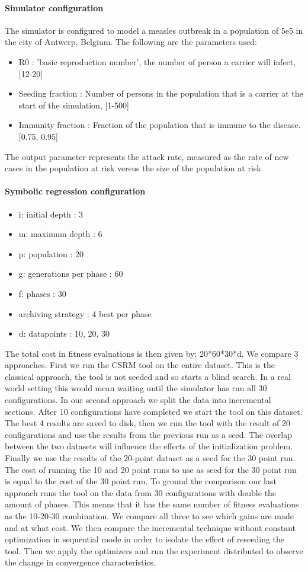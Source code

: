 \paragraph{Simulator configuration}
The simulator is configured to model a measles outbreak in a population of 5e5 in the city of Antwerp, Belgium. 
The following are the parameters used:
\begin{itemize}
\item R0 : 'basic reproduction number', the number of person a carrier will infect, [12-20]
\item Seeding fraction : Number of persons in the population that is a carrier at the start of the simulation, [1-500]
\item Immunity fraction : Fraction of the population that is immune to the disease. [0.75, 0.95]
\end{itemize}
The output parameter represents the attack rate, measured as the rate of new cases in the population at risk versus the size of the population at risk.
\paragraph{Symbolic regression configuration}
\begin{itemize}
\item i: initial depth : 3
\item m: maximum depth : 6
\item p: population : 20
\item g: generations per phase : 60
\item f: phases : 30
\item archiving strategy : 4 best per phase
\item d: datapoints : 10, 20, 30
\end{itemize}
The total cost in fitness evaluations is then given by: 20*60*30*d.
We compare 3 approaches. First we run the CSRM tool on the entire dataset. This is the classical approach, the tool is not seeded and so starts a blind search. In a real world setting this would mean waiting until the simulator has run all 30 configurations.
In our second approach we split the data into incremental sections. After 10 configurations have completed we start the tool on this dataset. 
The best 4 results are saved to disk, then we run the tool with the result of 20 configurations and use the results from the previous run as a seed. The overlap between the two datasets will influence the effects of the initialization problem. Finally we use the results of the 20-point dataset as a seed for the 30 point run. 
The cost of running the 10 and 20 point runs to use as seed for the 30 point run is equal to the cost of the 30 point run. 
To ground the comparison our last approach runs the tool on the data from 30 configurations with double the amount of phases. This means that it has the same number of fitness evaluations as the 10-20-30 combination. We compare all three to see which gains are made and at what cost.
We then compare the incremental technique without constant optimization in sequential mode in order to isolate the effect of reseeding the tool.
Then we apply the optimizers and run the experiment distributed to observe the change in convergence characteristics.
